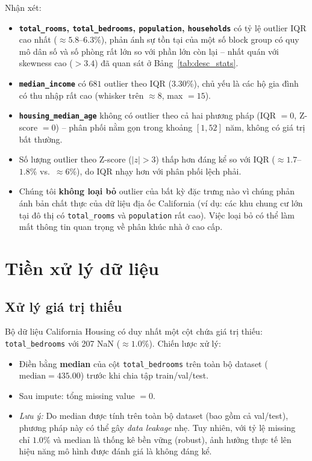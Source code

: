 \documentclass[12pt, a4paper]{article}
\begin{document}
Nhận xét:
\begin{itemize}
  \item \textbf{\texttt{total\_rooms}, \texttt{total\_bedrooms},
        \texttt{population}, \texttt{households}} có tỷ lệ outlier IQR
        cao nhất ($\approx 5.8$--$6.3\%$), phản ánh sự tồn tại của một số
        block group có quy mô dân số và số phòng rất lớn so với phần lớn
        còn lại -- nhất quán với skewness cao ($> 3.4$) đã quan sát ở
        Bảng~\ref{tab:desc_stats}.
  \item \textbf{\texttt{median\_income}} có $681$ outlier theo IQR
        ($3.30\%$), chủ yếu là các hộ gia đình có thu nhập rất cao
        (whisker trên $\approx 8$, max $= 15$).
  \item \textbf{\texttt{housing\_median\_age}} không có outlier theo cả
        hai phương pháp (IQR $= 0$, Z-score $= 0$) -- phân phối nằm gọn
        trong khoảng $[1, 52]$ năm, không có giá trị bất thường.
  \item Số lượng outlier theo Z-score ($|z| > 3$) thấp hơn đáng kể so
        với IQR ($\approx 1.7$--$1.8\%$ vs.\ $\approx 6\%$), do IQR nhạy
        hơn với phân phối lệch phải.
  \item Chúng tôi \textbf{không loại bỏ} outlier của bất kỳ đặc trưng
        nào vì chúng phản ánh bản chất thực của dữ liệu địa ốc California
        (ví dụ: các khu chung cư lớn tại đô thị có \texttt{total\_rooms}
        và \texttt{population} rất cao). Việc loại bỏ có thể làm mất thông
        tin quan trọng về phân khúc nhà ở cao cấp.
\end{itemize}

\section{Tiền xử lý dữ liệu}
\label{sec:preprocessing}

\subsection{Xử lý giá trị thiếu}

Bộ dữ liệu California Housing có duy nhất một cột chứa giá trị thiếu:
\texttt{total\_bedrooms} với 207 NaN ($\approx 1.0\%$). Chiến lược xử lý:

\begin{itemize}
  \item Điền bằng \textbf{median} của cột \texttt{total\_bedrooms}
        trên toàn bộ dataset ($\text{median} = 435.00$) trước khi chia
        tập train/val/test.
  \item Sau impute: tổng missing value $= 0$.
  \item \textit{Lưu ý:} Do median được tính trên toàn bộ dataset (bao gồm
        cả val/test), phương pháp này có thể gây \emph{data leakage} nhẹ.
        Tuy nhiên, với tỷ lệ missing chỉ $1.0\%$ và median là thống kê
        bền vững (robust), ảnh hưởng thực tế lên hiệu năng mô hình
        được đánh giá là không đáng kể.
\end{itemize}
\end{document}
